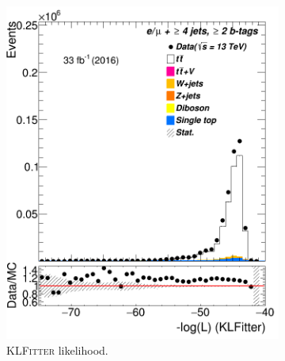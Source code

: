 \begin{figure}
\begin{subfigure}{0.35\textwidth}
		\includegraphics[width=\linewidth]{ControlPlots_emujets_2016_4incl_2incl/klf_LL_emujets_2016.png}
		\caption{\textsc{KLFitter} likelihood.} \label{fig:433}
	\end{subfigure}	
	\hspace*{1.5cm}	
	\begin{subfigure}{0.35\textwidth}

\end{subfigure}
\end{figure}

